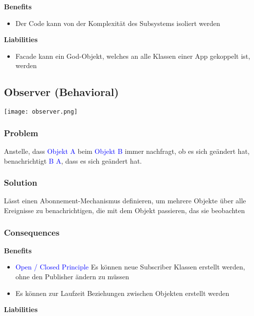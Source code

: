 \textbf{Benefits}
\begin{itemize}
    \item Der Code kann von der Komplexität des Subsystems isoliert werden
\end{itemize}
\vspace{10pt}
\textbf{Liabilities}

\begin{itemize}
    \item Facade kann ein God-Objekt, welches an alle Klassen einer App gekoppelt ist, werden
\end{itemize}

\subsection{Observer (Behavioral)}

\texttt{[image: observer.png]}

\subsubsection{Problem}

Anstelle, dass \textcolor{blue}{Objekt A} beim \textcolor{blue}{Objekt B} immer nachfragt, ob es sich geändert hat, benachrichtigt \textcolor{blue}{B} \textcolor{blue}{A}, dass es sich geändert hat.

\subsubsection{Solution}

Lässt einen Abonnement-Mechanismus definieren, um mehrere Objekte über alle Ereignisse zu benachrichtigen, die mit dem Objekt passieren, das sie beobachten

\subsubsection{Consequences}

\textbf{Benefits}
\begin{itemize}
    \item \textcolor{blue}{Open / Closed Principle} Es können neue Subscriber Klassen erstellt werden, ohne den Publisher
    ändern zu müssen
    \item Es können zur Laufzeit Beziehungen zwischen Objekten erstellt werden
\end{itemize}
\vspace{10pt}
\textbf{Liabilities}

